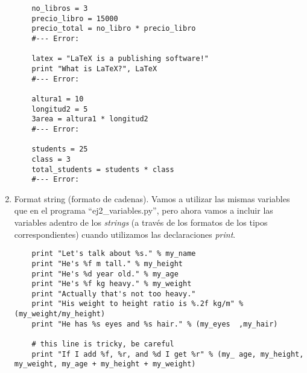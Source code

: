 \documentclass[10pt, twocolumn]{article}
\begin{document}
\begin{enumerate}
\begin{verbatim}
	no_libros = 3
	precio_libro = 15000
	precio_total = no_libro * precio_libro
	#--- Error: 
	
	latex = "LaTeX is a publishing software!"
	print "What is LaTeX?", LaTeX
	#--- Error: 
	
	altura1 = 10
	longitud2 = 5
	3area = altura1 * longitud2
	#--- Error: 

	students = 25
	class = 3
	total_students = students * class
	#--- Error: 
\end{verbatim}

\item Format string (formato de cadenas). Vamos a utilizar las mismas variables que en el programa ``ej2\_variables.py'', pero ahora vamos a incluir las variables adentro de los \emph{strings} (a través de los formatos de los tipos correspondientes) cuando utilizamos las declaraciones \emph{print}.
\begin{verbatim}
	print "Let's talk about %s." % my_name
	print "He's %f m tall." % my_height
	print "He's %d year old." % my_age
	print "He's %f kg heavy." % my_weight
	print "Actually that's not too heavy."
	print "His weight to height ratio is %.2f kg/m"	% (my_weight/my_height)
	print "He has %s eyes and %s hair." % (my_eyes	,my_hair)
	
	# this line is tricky, be careful 
	print "If I add %f, %r, and %d I get %r" % (my_	age, my_height, my_weight, my_age + my_height +	my_weight)
\end{verbatim}

\end{enumerate}
\end{document}
